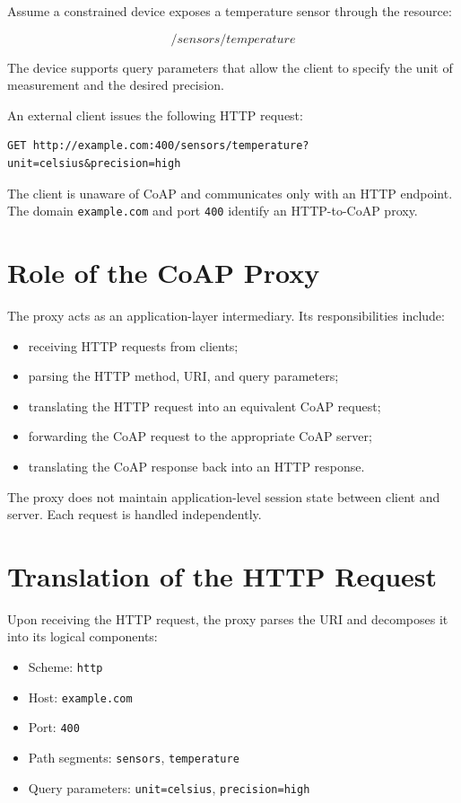 \documentclass{scrbook}
\begin{document}
Assume a constrained device exposes a temperature sensor through the resource:

\[
/sensors/temperature
\]

The device supports query parameters that allow the client to specify the unit of measurement and the desired precision.

An external client issues the following HTTP request:

\begin{verbatim}
GET http://example.com:400/sensors/temperature?unit=celsius&precision=high
\end{verbatim}

The client is unaware of CoAP and communicates only with an HTTP endpoint. The domain \texttt{example.com} and port \texttt{400} identify an HTTP-to-CoAP proxy.

\section{Role of the CoAP Proxy}

The proxy acts as an application-layer intermediary. Its responsibilities include:

\begin{itemize}
    \item receiving HTTP requests from clients;
    \item parsing the HTTP method, URI, and query parameters;
    \item translating the HTTP request into an equivalent CoAP request;
    \item forwarding the CoAP request to the appropriate CoAP server;
    \item translating the CoAP response back into an HTTP response.
\end{itemize}

The proxy does not maintain application-level session state between client and server. Each request is handled independently.

\section{Translation of the HTTP Request}

Upon receiving the HTTP request, the proxy parses the URI and decomposes it into its logical components:

\begin{itemize}
    \item Scheme: \texttt{http}
    \item Host: \texttt{example.com}
    \item Port: \texttt{400}
    \item Path segments: \texttt{sensors}, \texttt{temperature}
    \item Query parameters: \texttt{unit=celsius}, \texttt{precision=high}
\end{itemize}
\end{document}
